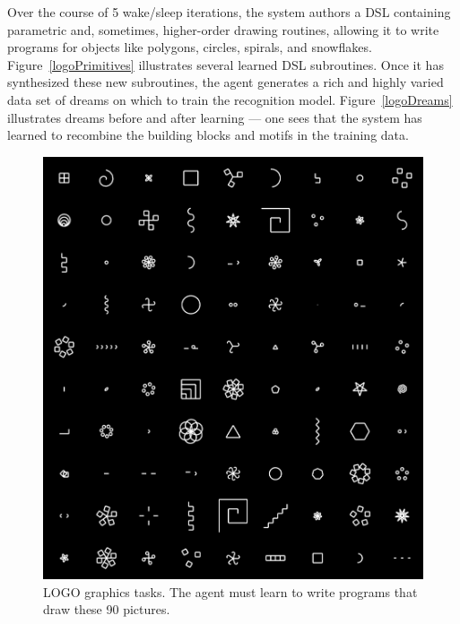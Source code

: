 \documentclass{article}
\begin{document}
Over the course of 5 wake/sleep iterations,
the system authors a DSL
containing parametric and, sometimes, higher-order drawing routines,
allowing it to write programs for objects like
polygons, circles, spirals, and snowflakes.
Figure~\ref{logoPrimitives}
illustrates several learned DSL subroutines.
Once it has synthesized these new subroutines,
the agent generates a rich and highly varied
data set of dreams on which to train the recognition model.
Figure~\ref{logoDreams}
illustrates  dreams before and after learning ---
one sees that
the system has learned to recombine
the building blocks and motifs in the training data.
\begin{figure}
  \includegraphics[width = \textwidth]{figures/logo90.png}
  \caption{LOGO graphics tasks. The agent must learn to write programs that draw these 90 pictures.}\label{everyLogo}
\end{figure}
\end{document}
